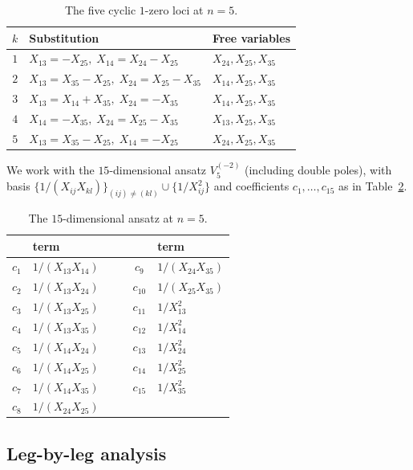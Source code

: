 \documentclass[11pt]{article}
\theoremstyle{plain}
\theoremstyle{definition}
\begin{document}
\begin{table}[ht]
\centering
\small
\begin{tabular}{c|l|l}
\toprule
$k$ & Substitution & Free variables \\
\midrule
$1$ & $X_{13} = -X_{25},\; X_{14} = X_{24} - X_{25}$ & $X_{24}, X_{25}, X_{35}$ \\
$2$ & $X_{13} = X_{35}-X_{25},\; X_{24} = X_{25} - X_{35}$ & $X_{14}, X_{25}, X_{35}$ \\
$3$ & $X_{13} = X_{14} + X_{35},\; X_{24} = -X_{35}$ & $X_{14}, X_{25}, X_{35}$ \\
$4$ & $X_{14} = -X_{35},\; X_{24} = X_{25} - X_{35}$ & $X_{13}, X_{25}, X_{35}$ \\
$5$ & $X_{13} = X_{35}-X_{25},\; X_{14} = -X_{25}$ & $X_{24}, X_{25}, X_{35}$ \\
\bottomrule
\end{tabular}
\caption{The five cyclic $1$-zero loci at $n=5$.}
\label{tab:loci5}
\end{table}

We work with the $15$-dimensional ansatz $V_5^{(-2)}$ (including double poles), with
basis $\{1/(X_{ij} X_{kl})\}_{(ij) \ne (kl)} \cup \{1/X_{ij}^2\}$ and coefficients
$c_1, \ldots, c_{15}$ as in Table~\ref{tab:basis5}.

\begin{table}[ht]
\centering
\small
\begin{tabular}{clcccl}
\toprule
& term & & & & term \\
\midrule
$c_1$  & $1/(X_{13} X_{14})$ & & & $c_9$    & $1/(X_{24} X_{35})$ \\
$c_2$  & $1/(X_{13} X_{24})$ & & & $c_{10}$ & $1/(X_{25} X_{35})$ \\
$c_3$  & $1/(X_{13} X_{25})$ & & & $c_{11}$ & $1/X_{13}^2$ \\
$c_4$  & $1/(X_{13} X_{35})$ & & & $c_{12}$ & $1/X_{14}^2$ \\
$c_5$  & $1/(X_{14} X_{24})$ & & & $c_{13}$ & $1/X_{24}^2$ \\
$c_6$  & $1/(X_{14} X_{25})$ & & & $c_{14}$ & $1/X_{25}^2$ \\
$c_7$  & $1/(X_{14} X_{35})$ & & & $c_{15}$ & $1/X_{35}^2$ \\
$c_8$  & $1/(X_{24} X_{25})$ & & & & \\
\bottomrule
\end{tabular}
\caption{The $15$-dimensional ansatz at $n=5$.}
\label{tab:basis5}
\end{table}

\subsection{Leg-by-leg analysis}
\end{document}
